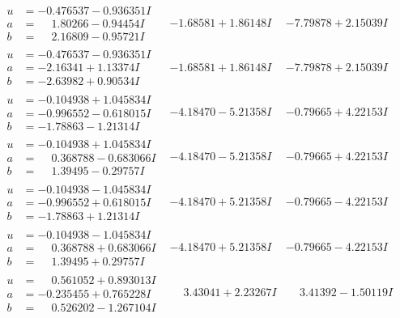 \documentclass[1p]{elsarticle_modified}
\theoremstyle{definition}
\begin{document}
$$\begin{array}{c|c|c}
\begin{aligned}
u &= -0.476537 - 0.936351 I \\
a &= \phantom{-}1.80266 - 0.94454 I \\
b &= \phantom{-}2.16809 - 0.95721 I\end{aligned}
 & -1.68581 + 1.86148 I & -7.79878 + 2.15039 I \\ \hline\begin{aligned}
u &= -0.476537 - 0.936351 I \\
a &= -2.16341 + 1.13374 I \\
b &= -2.63982 + 0.90534 I\end{aligned}
 & -1.68581 + 1.86148 I & -7.79878 + 2.15039 I \\ \hline\begin{aligned}
u &= -0.104938 + 1.045834 I \\
a &= -0.996552 - 0.618015 I \\
b &= -1.78863 - 1.21314 I\end{aligned}
 & -4.18470 - 5.21358 I & -0.79665 + 4.22153 I \\ \hline\begin{aligned}
u &= -0.104938 + 1.045834 I \\
a &= \phantom{-}0.368788 - 0.683066 I \\
b &= \phantom{-}1.39495 - 0.29757 I\end{aligned}
 & -4.18470 - 5.21358 I & -0.79665 + 4.22153 I \\ \hline\begin{aligned}
u &= -0.104938 - 1.045834 I \\
a &= -0.996552 + 0.618015 I \\
b &= -1.78863 + 1.21314 I\end{aligned}
 & -4.18470 + 5.21358 I & -0.79665 - 4.22153 I \\ \hline\begin{aligned}
u &= -0.104938 - 1.045834 I \\
a &= \phantom{-}0.368788 + 0.683066 I \\
b &= \phantom{-}1.39495 + 0.29757 I\end{aligned}
 & -4.18470 + 5.21358 I & -0.79665 - 4.22153 I \\ \hline\begin{aligned}
u &= \phantom{-}0.561052 + 0.893013 I \\
a &= -0.235455 + 0.765228 I \\
b &= \phantom{-}0.526202 - 1.267104 I\end{aligned}
 & \phantom{-}3.43041 + 2.23267 I & \phantom{-}3.41392 - 1.50119 I \\ \hline\begin{aligned}

\end{aligned}
\end{array}$$
\end{document}
